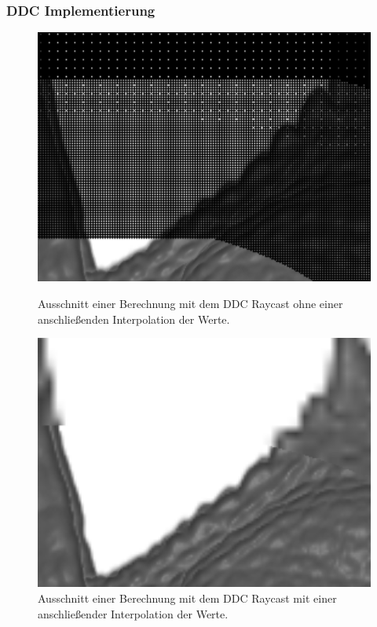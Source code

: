 \subsubsection{DDC Implementierung}
\begin{figure}[]
	\centering
	\begin{minipage}[t]{0.49\textwidth}
		\centering
		\includegraphics[width=1\textwidth]{../../Grafiken/results/implementierung/ddc_o_ip_cut.png}
		\caption{Ausschnitt einer Berechnung mit dem DDC Raycast ohne einer anschließenden Interpolation der Werte.}
		\label{fig::imp::ddc_o_ip}
	\end{minipage}
	\hfill
	\begin{minipage}[t]{0.49\textwidth}
		\centering
		\includegraphics[width=1\textwidth]{../../Grafiken/results/implementierung/ddc_m_ip_cut.png}
		\caption{Ausschnitt einer Berechnung mit dem DDC Raycast mit einer anschließender Interpolation der Werte.}
		\label{fig::imp::ddc_m_ip}
	\end{minipage}
\end{figure}

